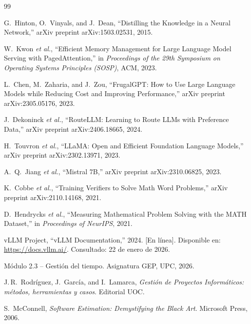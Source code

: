 \begin{thebibliography}{99}

G.~Hinton, O.~Vinyals, and J.~Dean, ``Distilling the Knowledge in a Neural Network,'' arXiv preprint arXiv:1503.02531, 2015.

W.~Kwon \textit{et al.}, ``Efficient Memory Management for Large Language Model Serving with PagedAttention,'' in \textit{Proceedings of the 29th Symposium on Operating Systems Principles (SOSP)}, ACM, 2023.

L.~Chen, M.~Zaharia, and J.~Zou, ``FrugalGPT: How to Use Large Language Models while Reducing Cost and Improving Performance,'' arXiv preprint arXiv:2305.05176, 2023.

J.~Dekoninck \textit{et al.}, ``RouteLLM: Learning to Route LLMs with Preference Data,'' arXiv preprint arXiv:2406.18665, 2024.

H.~Touvron \textit{et al.}, ``LLaMA: Open and Efficient Foundation Language Models,'' arXiv preprint arXiv:2302.13971, 2023.

A.~Q.~Jiang \textit{et al.}, ``Mistral 7B,'' arXiv preprint arXiv:2310.06825, 2023.

K.~Cobbe \textit{et al.}, ``Training Verifiers to Solve Math Word Problems,'' arXiv preprint arXiv:2110.14168, 2021.

D.~Hendrycks \textit{et al.}, ``Measuring Mathematical Problem Solving with the MATH Dataset,'' in \textit{Proceedings of NeurIPS}, 2021.

vLLM Project, ``vLLM Documentation,'' 2024. [En línea]. Disponible en: \url{https://docs.vllm.ai/}. Consultado: 22 de enero de 2026.

Módulo 2.3 -- Gestión del tiempo. Asignatura GEP, UPC, 2026.

J.\,R.~Rodríguez, J.~García, and I.~Lamarca, \textit{Gestión de Proyectos Informáticos: métodos, herramientas y casos}. Editorial UOC.

S.~McConnell, \textit{Software Estimation: Demystifying the Black Art}. Microsoft Press, 2006.


\end{thebibliography}
